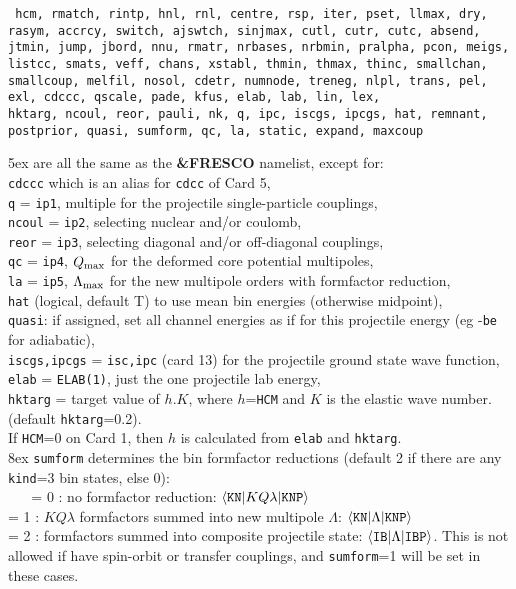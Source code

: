 \documentclass[11pt]{article}
\begin{document}
{\tt
hcm, rmatch, rintp, hnl, rnl, centre,  rsp, iter, pset, llmax,  dry,
rasym, accrcy, switch, ajswtch, sinjmax,  cutl, cutr, cutc,
absend, jtmin, jump, jbord, nnu,  rmatr, nrbases, nrbmin,  pralpha, pcon,  meigs,
listcc, smats, veff, chans, xstabl, thmin, thmax, thinc,
smallchan, smallcoup, melfil, nosol, cdetr, numnode, treneg,
nlpl, trans, pel, exl, cdccc, qscale, pade, kfus,
elab,  lab, lin, lex, \\
hktarg, ncoul, reor, pauli,  nk,
q, ipc, iscgs, ipcgs,  hat, remnant, postprior, quasi,
sumform, qc, la, static, expand, maxcoup
}\\

\vspace{-3mm}

\hangindent 5ex
are all the same as the {\bf \&FRESCO} namelist, except for:\\
{\tt cdccc} which is an alias for {\tt cdcc} of Card 5,\\
{\tt q} = {\tt ip1}, multiple for the projectile single-particle couplings,\\
{\tt ncoul} = {\tt ip2}, selecting nuclear and/or coulomb,\\
{\tt reor} = {\tt ip3}, selecting diagonal and/or off-diagonal couplings,\\
{\tt qc} = {\tt ip4}, $Q_{\rm max}$ for the deformed core potential multipoles,\\
{\tt la} = {\tt ip5}, $\Lambda_{\rm max}$ for the new multipole orders with formfactor reduction,\\
{\tt hat} (logical, default T) to use mean bin energies (otherwise midpoint),\\
{\tt quasi}: if assigned, set all channel energies as if for this projectile
energy (eg -{\tt be} for adiabatic),\\
{\tt iscgs,ipcgs} = {\tt isc,ipc} (card 13) for the projectile ground state wave
function,\\
{\tt elab} = {\tt ELAB(1)}, just the one projectile lab energy,\\
{\tt hktarg} = target value of $h.K$, where $h$={\tt HCM} and $K$ is the elastic wave number.
(default {\tt hktarg}=0.2). \\
\hspace*{1cm} If {\tt HCM}=0 on Card 1,
then $h$ is calculated from {\tt elab} and {\tt hktarg}.\\



\hangindent 8ex
{\tt sumform} determines the bin formfactor reductions
(default 2 if there are any {\tt kind}=3 bin states, else 0):\\
~ ~   = 0 : no formfactor reduction:
     $\langle {\tt KN} | K Q \lambda | {\tt KNP} \rangle$
\\    = 1 : $KQ\lambda$ formfactors summed into new multipole $\Lambda$:
     $\langle {\tt KN} | \Lambda | {\tt KNP} \rangle$
\\    = 2 : formfactors summed into composite projectile state:
     $\langle {\tt IB} | {\Lambda} | {\tt IBP} \rangle$.
      This is not allowed if have spin-orbit or transfer couplings, and
      {\tt sumform}=1 will be set in these cases.\\
\end{document}
